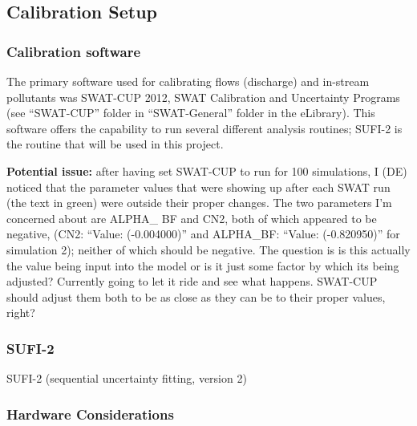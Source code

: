 \subsection{Calibration Setup}
	\subsubsection{Calibration software}
	The primary software used for calibrating flows (discharge) and in-stream pollutants was SWAT-CUP 2012, SWAT Calibration and Uncertainty Programs (see ``SWAT-CUP'' folder in ``SWAT-General'' folder in the e\textunderscore Library). This software offers the capability to run several different analysis routines; SUFI-2 is the routine that will be used in this project. 
	
	\textbf{Potential issue:} after having set SWAT-CUP to run for 100 simulations, I (DE) noticed that the parameter values that were showing up after each SWAT run (the text in green) were outside their proper changes. The two parameters I'm concerned about are ALPHA\_ BF and CN2, both of which appeared to be negative, (CN2: ``Value: (-0.004000)'' and ALPHA\_BF: ``Value: (-0.820950)'' for simulation 2); neither of which should be negative. The question is is this actually the value being input into the model or is it just some factor by which its being adjusted? Currently going to let it ride and see what happens. SWAT-CUP should adjust them both to be as close as they can be to their proper values, right?
	
	\subsubsection{SUFI-2}
	SUFI-2 (sequential uncertainty fitting, version 2) 
	  
	\subsubsection{Hardware Considerations}
\pagebreak